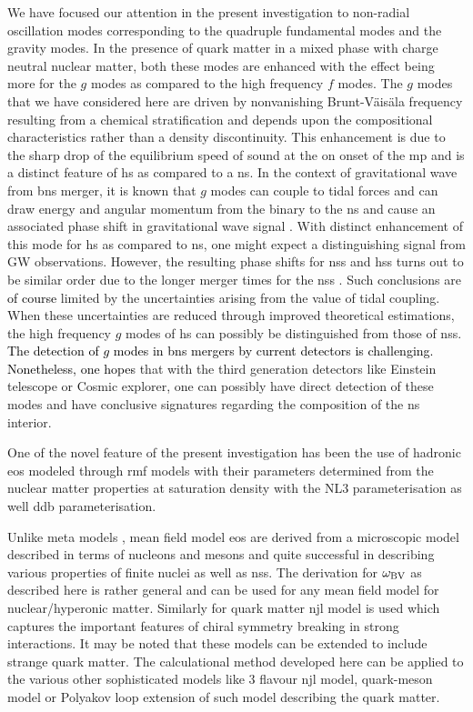 \documentclass[a4paper, 11pt]{article}
\newcommand{\magenta}[1]{\textcolor{black}{#1}}
\begin{document}
{We have focused our attention in the present investigation to non-radial oscillation modes corresponding 
to the quadruple fundamental modes and the gravity modes. In the presence of  quark matter in a mixed phase
 with charge neutral nuclear matter, both these modes are enhanced with the effect being more for the $g$ modes as 
compared to the high frequency $f$ modes. The $g$ modes that we have considered here are driven by
 nonvanishing Brunt-V\"ais\"ala frequency resulting from a chemical stratification and depends upon the 
compositional characteristics rather than a density discontinuity. This enhancement is due to the sharp drop of 
the equilibrium speed of sound at the on onset of the \ac{mp} and is a distinct feature of \ac{hs} as compared to
 a \ac{ns}. In the context of gravitational wave from \ac{bns} merger, it is known that $g$ modes can couple
 to tidal forces and can draw energy and angular momentum from the binary to the \ac{ns} and cause an 
associated phase shift in gravitational wave signal \cite{Lai:1994}. With distinct enhancement of this mode for \ac{hs}
 as compared to \ac{ns}, one might expect a distinguishing signal from GW observations. However, the resulting
 phase shifts for \ac{ns}s and \ac{hs}s turns out to be similar order due to the longer merger times for
 the \ac{ns}s \cite{Jaikumar:2021jbw}. Such conclusions are \magenta{of course} limited by the uncertainties arising 
from the value of tidal coupling. When these uncertainties are reduced through improved theoretical estimations,
 the high frequency $g$ modes of \ac{hs} can possibly be distinguished from those of \ac{ns}s. \magenta{The
 detection of $g$ modes in \ac{bns} mergers by current detectors is challenging. Nonetheless, one hopes} that with 
the third generation detectors like Einstein telescope or Cosmic explorer, one can possibly have direct 
detection of these modes and have conclusive signatures regarding the composition of the \ac{ns} interior.

One of the novel feature of the present investigation has been the use of hadronic \ac{eos} modeled through  \ac{rmf} models with their parameters determined from the nuclear matter properties at saturation density with the NL3 parameterisation as well \ac{ddb} parameterisation.  

Unlike meta models \cite{Jaikumar:2021jbw}, mean field model \ac{eos} are derived from a microscopic model described in terms of nucleons and mesons and quite successful in describing various properties of finite nuclei as well as \ac{ns}s. The derivation for $\omega_{\rm BV}$ as described here is rather general and can be used for any mean field model for nuclear/hyperonic matter. Similarly for quark matter \ac{njl} model is used which captures the important features of chiral symmetry breaking in strong interactions. It may be noted that these models can be extended to include strange quark matter. The calculational method developed here can be applied to the various other sophisticated models like 3 flavour \ac{njl} model, quark-meson model or Polyakov loop extension of such model describing the quark matter.

}
\end{document}

